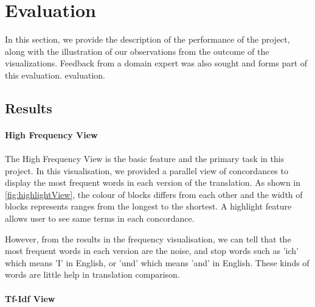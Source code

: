\clearpage
\section{Evaluation}
In this section, we provide the description of the performance of the project, along with the illustration of our observations from the outcome of the visualizations. Feedback from a domain expert was also sought and forms part of this evaluation. evaluation.

\subsection{Results}

\paragraph{High Frequency View}
\paragraph[]{}
The High Frequency View is the basic feature and the primary task in this project. In this visualisation, we provided a parallel view of concordances to display the most frequent words in each version of the translation. As shown in \ref{fig:highlightView}, the colour of blocks differs from each other and the width of blocks represents ranges from the longest to the shortest. A highlight feature allows user to see same terms in each concordance.


However, from the results in the frequency visualisation, we can tell that the most frequent words in each version are the noise, and stop words such as 'ich' which means 'I' in English, or 'und' which means 'and' in English. These kinds of words are little help in translation comparison.


\paragraph{Tf-Idf View}
